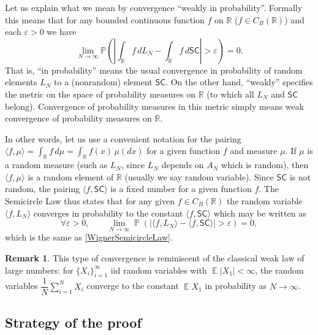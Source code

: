 \documentclass[letterpaper,11pt,oneside,reqno]{amsart}
\numberwithin{equation}{section}
\newcommand{\lect}[1]{}
\newcommand{\SC}{\mathsf{SC}}
\DeclareMathOperator{\EE}{\mathbb{E}}
\DeclareMathOperator{\PP}{\mathbb{P}}
\theoremstyle{definition}
\newtheorem{remark}[proposition]{Remark}
\begin{document}
Let us explain what we mean by convergence ``weakly in probability''. Formally this means that
for any bounded continuous function $f$ on $\mathbb R$ ($f\in C_B(\mathbb R)$) and each $\varepsilon>0$ we have 
\begin{equation}\label{WignerSemicircleLaw}
\lim_{N\to\infty}\mathbb P\left(\left|\int_{\mathbb R} f\,dL_N-\int_{\mathbb R} f\,d\SC\right|>\varepsilon\right)=0.
\end{equation}
That is, ``in probability'' means the usual convergence in probability  of
random elements $L_N$ to a (nonrandom) element $\SC$.  On the other hand,
``weakly'' specifies the metric on the space of probability measures on
$\mathbb{R}$ (to which all $L_N$ and $\SC$ belong). Convergence of probability
measures in this metric simply means weak convergence of probability measures
on $\mathbb{R}$.

In other words,
let us use a convenient notation for the pairing $\langle f,\mu\rangle
=\int_{\mathbb R} f\,d\mu=\int_{\mathbb R}f(x)\,\mu(dx)$ for a given
function $f$ and measure $\mu$.  If $\mu$ is a random measure (such as $L_N$,
since $L_N$ depends on $A_N$ which is random), then $\langle f,\mu\rangle$ is
a random element of $\mathbb R$ (usually we say random variable).  Since $\SC$
is not random, the pairing $\langle f,\SC\rangle$ is a fixed number for a given function $f$.  The
Semicircle Law thus states that for any given $f\in C_B(\mathbb R)$ the random variable
$\langle f,L_N\rangle$ converges in probability to the constant $\langle f,\SC\rangle$ which may be written as
\begin{equation}\label{WignerSemicircleLaw_langle}
\forall \varepsilon>0,\qquad \lim_{N\to\infty}\PP\left(\left|\langle f,L_N\rangle-\langle f,\SC\rangle\right|>\varepsilon\right)=0,
\end{equation}
which is the same as \eqref{WignerSemicircleLaw}.

\begin{remark}
	This type of convergence is reminiscent of the classical weak law of large numbers: for
	$\{X_i\}_{i=1}^\infty$ iid random variables with $\EE|X_1| <\infty$, the random
	variables $\dfrac{1}N\sum_{i=1}^N X_i$ converge to the constant $\EE X_1$ in probability as $N\to\infty$.
\end{remark}


\lect{1/25/2016}

\subsection{Strategy of the proof} %
\label{sub:strategy_of_the_proof}
\end{document}
